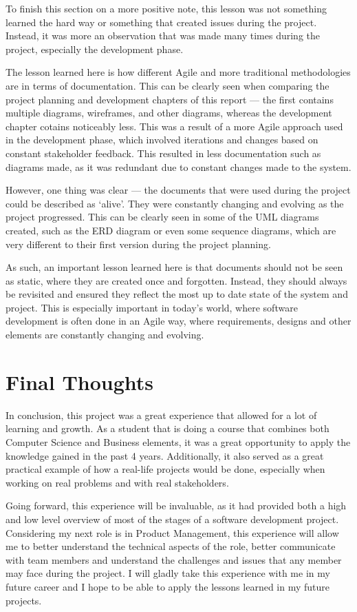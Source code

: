 To finish this section on a more positive note, this lesson was not something learned the hard way or something that created issues during the project. Instead, it was more an observation that was made many times during the project, especially the development phase. 

The lesson learned here is how different Agile and more traditional methodologies are in terms of documentation. This can be clearly seen when comparing the project planning and development chapters of this report --- the first contains multiple diagrams, wireframes, and other diagrams, whereas the development chapter cotains noticeably less. This was a result of a more Agile approach used in the development phase, which involved iterations and changes based on constant stakeholder feedback. This resulted in less documentation such as diagrams made, as it was redundant due to constant changes made to the system. 

However, one thing was clear --- the documents that were used during the project could be described as `alive'. They were constantly changing and evolving as the project progressed. This can be clearly seen in some of the UML diagrams created, such as the ERD diagram or even some sequence diagrams, which are very different to their first version during the project planning.

As such, an important lesson learned here is that documents should not be seen as static, where they are created once and forgotten. Instead, they should always be revisited and ensured they reflect the most up to date state of the system and project. This is especially important in today's world, where software development is often done in an Agile way, where requirements, designs and other elements are constantly changing and evolving.

\section{Final Thoughts}

In conclusion, this project was a great experience that allowed for a lot of learning and growth. As a student that is doing a course that combines both Computer Science and Business elements, it was a great opportunity to apply the knowledge gained in the past 4 years. Additionally, it also served as a great practical example of how a real-life projects would be done, especially when working on real problems and with real stakeholders. 

Going forward, this experience will be invaluable, as it had provided both a high and low level overview of most of the stages of a software development project. Considering my next role is in Product Management, this experience will allow me to better understand the technical aspects of the role, better communicate with team members and understand the challenges and issues that any member may face during the project. I will gladly take this experience with me in my future career and I hope to be able to apply the lessons learned in my future projects.